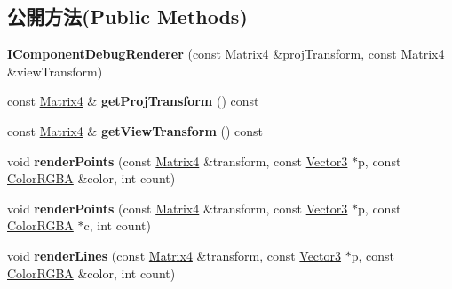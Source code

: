 \subsection*{公開方法(Public Methods)}
\begin{DoxyCompactItemize}
\item 
{\bfseries I\+Component\+Debug\+Renderer} (const \hyperlink{class_magnum_1_1_matrix4}{Matrix4} \&proj\+Transform, const \hyperlink{class_magnum_1_1_matrix4}{Matrix4} \&view\+Transform)\hypertarget{class_magnum_1_1_i_component_debug_renderer_acb3e2846ae5304a686d3e2e4fa332f2d}{}\label{class_magnum_1_1_i_component_debug_renderer_acb3e2846ae5304a686d3e2e4fa332f2d}

\item 
const \hyperlink{class_magnum_1_1_matrix4}{Matrix4} \& {\bfseries get\+Proj\+Transform} () const \hypertarget{class_magnum_1_1_i_component_debug_renderer_a93394cd289d57080096a451e135a0810}{}\label{class_magnum_1_1_i_component_debug_renderer_a93394cd289d57080096a451e135a0810}

\item 
const \hyperlink{class_magnum_1_1_matrix4}{Matrix4} \& {\bfseries get\+View\+Transform} () const \hypertarget{class_magnum_1_1_i_component_debug_renderer_ada752f2ec1052bb063b50d2191e9371d}{}\label{class_magnum_1_1_i_component_debug_renderer_ada752f2ec1052bb063b50d2191e9371d}

\item 
void {\bfseries render\+Points} (const \hyperlink{class_magnum_1_1_matrix4}{Matrix4} \&transform, const \hyperlink{class_magnum_1_1_vector3}{Vector3} $\ast$p, const \hyperlink{class_magnum_1_1_color_r_g_b_a}{Color\+R\+G\+BA} \&color, int count)\hypertarget{class_magnum_1_1_i_component_debug_renderer_ace53456e12a1f08d3964f973303ad4ff}{}\label{class_magnum_1_1_i_component_debug_renderer_ace53456e12a1f08d3964f973303ad4ff}

\item 
void {\bfseries render\+Points} (const \hyperlink{class_magnum_1_1_matrix4}{Matrix4} \&transform, const \hyperlink{class_magnum_1_1_vector3}{Vector3} $\ast$p, const \hyperlink{class_magnum_1_1_color_r_g_b_a}{Color\+R\+G\+BA} $\ast$c, int count)\hypertarget{class_magnum_1_1_i_component_debug_renderer_a18651ad025eddfe5f6e9bc21fe81940a}{}\label{class_magnum_1_1_i_component_debug_renderer_a18651ad025eddfe5f6e9bc21fe81940a}

\item 
void {\bfseries render\+Lines} (const \hyperlink{class_magnum_1_1_matrix4}{Matrix4} \&transform, const \hyperlink{class_magnum_1_1_vector3}{Vector3} $\ast$p, const \hyperlink{class_magnum_1_1_color_r_g_b_a}{Color\+R\+G\+BA} \&color, int count)\hypertarget{class_magnum_1_1_i_component_debug_renderer_a8c4f61e448ae48b963cb6cba6502f33f}{}\label{class_magnum_1_1_i_component_debug_renderer_a8c4f61e448ae48b963cb6cba6502f33f}


\end{DoxyCompactItemize}
